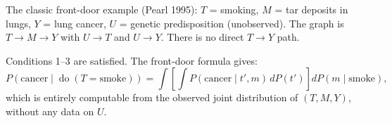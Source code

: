 \documentclass[
  a4paper,
]{book}
\newcommand{\doop}{\operatorname{do}}
\begin{document}
\begin{tcolorbox}[enhanced jigsaw, arc=.35mm, bottomrule=.15mm, bottomtitle=1mm, breakable, colback=white, colbacktitle=quarto-callout-note-color!10!white, colframe=quarto-callout-note-color-frame, coltitle=black, left=2mm, leftrule=.75mm, opacityback=0, opacitybacktitle=0.6, rightrule=.15mm, title={Example: Smoking, Tar, and Cancer}, titlerule=0mm, toprule=.15mm, toptitle=1mm]

The classic front-door example (Pearl 1995): \(T\) = smoking, \(M\) =
tar deposits in lungs, \(Y\) = lung cancer, \(U\) = genetic
predisposition (unobserved). The graph is \(T \to M \to Y\) with
\(U \to T\) and \(U \to Y\). There is no direct \(T\to Y\) path.

Conditions 1--3 are satisfied. The front-door formula gives:
\[P(\text{cancer} \mid \doop(T{=}\text{smoke})) = \int\!\left[\int P(\text{cancer} \mid t', m)\,dP(t')\right] dP(m \mid \text{smoke}),\]
which is entirely computable from the observed joint distribution of
\((T, M, Y)\), without any data on \(U\).

\end{tcolorbox}
\end{document}
